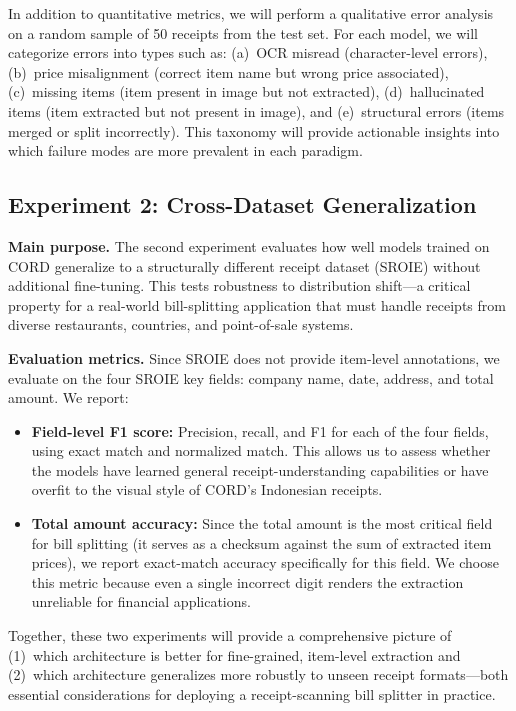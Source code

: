 \documentclass[9pt,twocolumn,twoside]{extarticle}
\begin{document}
In addition to quantitative metrics, we will perform a qualitative error analysis on a random sample of 50 receipts from the test set. For each model, we will categorize errors into types such as: (a)~OCR misread (character-level errors), (b)~price misalignment (correct item name but wrong price associated), (c)~missing items (item present in image but not extracted), (d)~hallucinated items (item extracted but not present in image), and (e)~structural errors (items merged or split incorrectly). This taxonomy will provide actionable insights into which failure modes are more prevalent in each paradigm.

\subsection{Experiment 2: Cross-Dataset Generalization}
\label{sec:exp2}

\noindent\textbf{Main purpose.}
The second experiment evaluates how well models trained on CORD generalize to a structurally different receipt dataset (SROIE) without additional fine-tuning. This tests robustness to distribution shift---a critical property for a real-world bill-splitting application that must handle receipts from diverse restaurants, countries, and point-of-sale systems.

\smallskip\noindent\textbf{Evaluation metrics.}
Since SROIE does not provide item-level annotations, we evaluate on the four SROIE key fields: company name, date, address, and total amount. We report:

\begin{itemize}
    \item \textbf{Field-level F1 score:} Precision, recall, and F1 for each of the four fields, using exact match and normalized match. This allows us to assess whether the models have learned general receipt-understanding capabilities or have overfit to the visual style of CORD's Indonesian receipts.

    \item \textbf{Total amount accuracy:} Since the total amount is the most critical field for bill splitting (it serves as a checksum against the sum of extracted item prices), we report exact-match accuracy specifically for this field. We choose this metric because even a single incorrect digit renders the extraction unreliable for financial applications.
\end{itemize}

Together, these two experiments will provide a comprehensive picture of (1)~which architecture is better for fine-grained, item-level extraction and (2)~which architecture generalizes more robustly to unseen receipt formats---both essential considerations for deploying a receipt-scanning bill splitter in practice.
\end{document}
